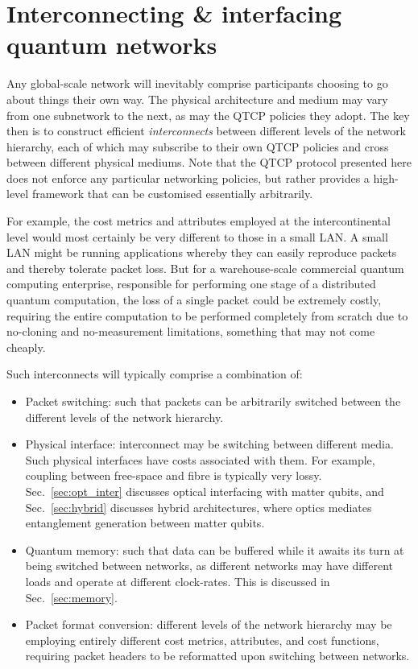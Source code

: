 %
%

\section{Interconnecting \& interfacing quantum networks} \label{sec:inter} 

Any global-scale network will inevitably comprise participants choosing to go about things their own way. The physical architecture and medium may vary from one subnetwork to the next, as may the QTCP policies they adopt. The key then is to construct efficient \textit{interconnects} between different levels of the network hierarchy, each of which may subscribe to their own QTCP policies and cross between different physical mediums. Note that the QTCP protocol presented here does not enforce any particular networking policies, but rather provides a high-level framework that can be customised essentially arbitrarily.

For example, the cost metrics and attributes employed at the intercontinental level would most certainly be very different to those in a small LAN. A small LAN might be running applications whereby they can easily reproduce packets and thereby tolerate packet loss. But for a warehouse-scale commercial quantum computing enterprise, responsible for performing one stage of a distributed quantum computation, the loss of a single packet could be extremely costly, requiring the entire computation to be performed completely from scratch due to no-cloning and no-measurement limitations, something that may not come cheaply.

Such interconnects will typically comprise a combination of:
\begin{itemize}
\item Packet switching: such that packets can be arbitrarily switched between the different levels of the network hierarchy.
\item Physical interface: interconnect may be switching between different media. Such physical interfaces have costs associated with them. For example, coupling between free-space and fibre is typically very lossy. Sec.~\ref{sec:opt_inter} discusses optical interfacing with matter qubits, and Sec.~\ref{sec:hybrid} discusses hybrid architectures, where optics mediates entanglement generation between matter qubits.
\item Quantum memory: such that data can be buffered while it awaits its turn at being switched between networks, as different networks may have different loads and operate at different clock-rates. This is discussed in Sec.~\ref{sec:memory}.
\item Packet format conversion: different levels of the network hierarchy may be employing entirely different cost metrics, attributes, and cost functions, requiring packet headers to be reformatted upon switching between networks.
\end{itemize}

